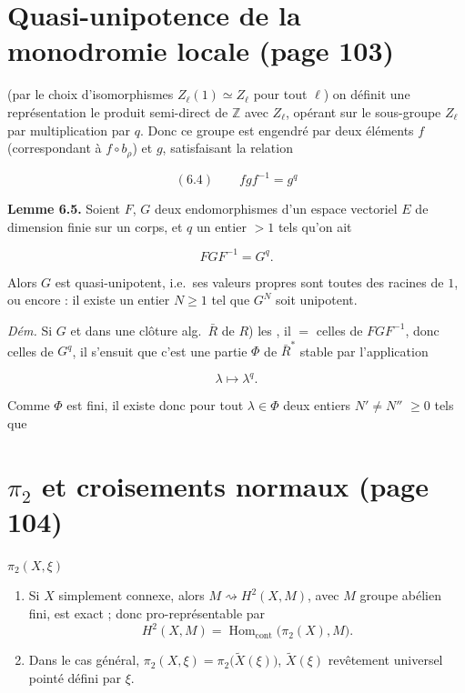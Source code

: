\documentclass[11pt,a4paper]{article}
\begin{document}
\section*{Quasi-unipotence de la monodromie locale (page 103)}


\ill{} (par le choix d'isomorphismes $Z_{\ell}(1) \simeq Z_{\ell}$ pour tout
$\ell$) \ill{} on définit une représentation \ill{} le produit semi-direct de
$\mathbb{Z}$ avec $Z_{\ell}$, opérant sur le sous-groupe $Z_{\ell}$ par
multiplication par $q$. Donc ce groupe est engendré par deux éléments $f$
(correspondant à $f\circ b_{\rho}$) et $g$, satisfaisant la relation

\begin{equation*}
(6.4) \qquad f g f^{-1} = g^{q}
\end{equation*}

\textbf{Lemme 6.5.} Soient $F$, $G$ deux \struck{\ill{}} endomorphismes d'un
espace vectoriel $E$ de dimension finie sur un corps, et $q$ un entier $> 1$
tels qu'on ait 

\[ F G F^{-1} = G^{q}. \]

Alors $G$ est quasi-unipotent, i.e.\ ses valeurs propres sont toutes des racines
de $1$, ou encore : il existe un entier $N \geqslant 1$ tel que $G^{N}$ soit
unipotent.

\emph{Dém.}  Si $G$ et \ill{} dans une clôture alg.\ $\bar{R}$ de
$R$)  les , il \ill{} $=$ celles de $F G F^{-1}$,
donc \ill{} celles de $G^{q}$, il s'ensuit que c'est une partie $\Phi$ de
$\bar{R}^{*}$ stable par l'application

\[ \lambda \longmapsto \lambda^{q}. \]

Comme $\Phi$ est fini, il existe donc pour tout $\lambda \in \Phi$ deux entiers
$N' \neq N''$  $\geqslant 0$ tels que \ill{}

\section*{$\pi_{2}$ et croisements normaux (page 104)}


$\pi_{2}(X, \xi)$

\begin{enumerate}
\item[a)] Si $X$ simplement connexe, alors $M \rightsquigarrow H^{2}(X, M)$,
avec $M$ \struck{\ill{}} groupe abélien fini, est exact ; donc
pro-représentable par
\[ H^{2}(X, M) = \operatorname{Hom}\nolimits_{\mathrm{cont}}\big(\pi_{2}(X),
M\big). \]

\item[b)] Dans le cas général, $\pi_{2}(X, \xi) = \pi_{2}\big(\tilde{X}(\xi)\big)$,
$\tilde{X}(\xi)$ revêtement universel pointé défini par $\xi$.
\end{enumerate}
\end{document}
